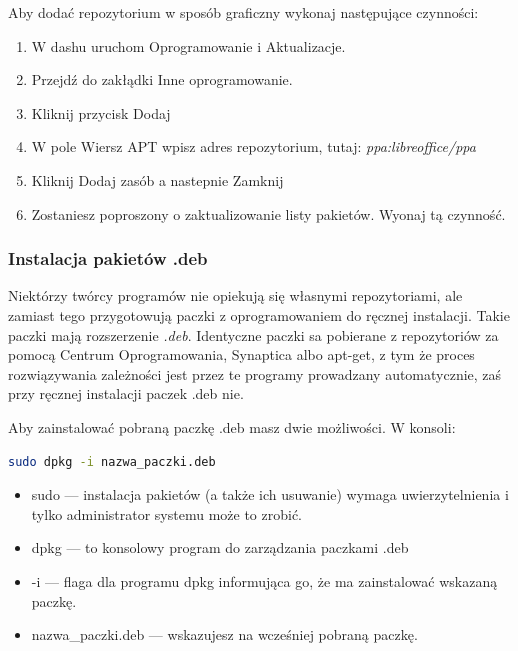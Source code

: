 Aby dodać repozytorium w sposób graficzny wykonaj następujące czynności:
\begin{enumerate}
\item W dashu uruchom \textcolor{ubuntu_orange}{Oprogramowanie i Aktualizacje}.
\item Przejdź do zakłądki \textcolor{ubuntu_orange}{Inne oprogramowanie}.
\item Kliknij przycisk \textcolor{ubuntu_orange}{Dodaj}
\item W pole \textcolor{ubuntu_orange}{Wiersz APT} wpisz adres repozytorium, tutaj: \textit{ppa:libreoffice/ppa}
\item Kliknij \textcolor{ubuntu_orange}{Dodaj zasób} a nastepnie \textcolor{ubuntu_orange}{Zamknij}
\item Zostaniesz poproszony o zaktualizowanie listy pakietów. Wyonaj tą czynność.
\end{enumerate}

\subsubsection{Instalacja pakietów .deb}
Niektórzy twórcy programów nie opiekują się własnymi repozytoriami, ale zamiast tego przygotowują paczki z oprogramowaniem do ręcznej instalacji. Takie paczki mają rozszerzenie \textit{.deb}. Identyczne paczki sa pobierane z repozytoriów za pomocą Centrum Oprogramowania, Synaptica albo apt-get, z tym że proces rozwiązywania zależności jest przez te programy prowadzany automatycznie, zaś przy ręcznej instalacji paczek .deb nie.

Aby zainstalować pobraną paczkę .deb masz dwie możliwości. W konsoli:
\begin{lstlisting}[language=bash]
sudo dpkg -i nazwa_paczki.deb
\end{lstlisting}
\begin{itemize}
\item \textcolor{ubuntu_orange}{sudo} --- instalacja pakietów (a także ich usuwanie) wymaga uwierzytelnienia i tylko administrator systemu może to zrobić.
\item \textcolor{ubuntu_orange}{dpkg} --- to konsolowy program do zarządzania paczkami .deb
\item \textcolor{ubuntu_orange}{-i} --- flaga dla programu dpkg informująca go, że ma zainstalować wskazaną paczkę.
\item \textcolor{ubuntu_orange}{nazwa\_paczki.deb} --- wskazujesz na wcześniej pobraną paczkę.
\end{itemize}

